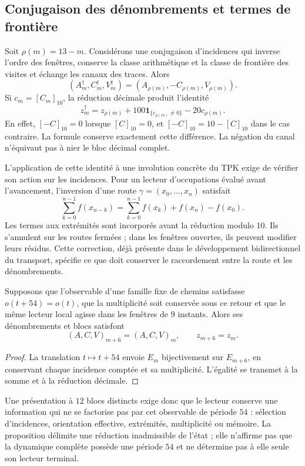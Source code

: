 \subsection{Conjugaison des dénombrements et termes de frontière}
\label{subsec:registro-conjugacion-incidencial}

Soit \(\rho(m)=13-m\). Considérons une conjugaison d'incidences
qui inverse l'ordre des fenêtres, conserve la classe arithmétique et la
classe de frontière des visites et échange les canaux des traces.
Alors
\[
 (A_m^\dagger,C_m^\dagger,V_m^\dagger)
 =(A_{\rho(m)},-C_{\rho(m)},V_{\rho(m)}).
\]
Si \(c_m=[C_m]_{10}\), la réduction décimale produit l'identité
\begin{equation}
 z_m^\dagger=z_{\rho(m)}
       +100\mathbf1_{\{c_{\rho(m)}\ne0\}}-20c_{\rho(m)}.
 \label{eq:registro-conjugacion-decimal}
\end{equation}
En effet, \([-C]_{10}=0\) lorsque \([C]_{10}=0\), et
\([-C]_{10}=10-[C]_{10}\) dans le cas contraire. La formule conserve
exactement cette différence. La négation du canal n'équivaut pas à nier
le bloc décimal complet.

L'application de cette identité à une involution concrète du TPK exige
de vérifier son action sur les incidences. Pour un lecteur d'occupations
évalué avant l'avancement, l'inversion d'une route
\(\gamma=(x_0,\ldots,x_n)\) satisfait
\[
 \sum_{k=0}^{n-1}f(x_{n-k})
 =\sum_{k=0}^{n-1}f(x_k)+f(x_n)-f(x_0).
\]
Les termes aux extrémités sont incorporés avant la réduction modulo
\(10\). Ils s'annulent sur les routes fermées ; dans les fenêtres ouvertes, ils peuvent
modifier leurs résidus. Cette correction, déjà présente dans le développement
bidirectionnel du transport, spécifie ce que doit conserver le raccordement
entre la route et les dénombrements.

\begin{proposition}
Supposons que l’observable d’une famille fixe de chemins satisfasse
\(o(t+54)=o(t)\), que la multiplicité soit conservée sous ce retour
et que le même lecteur local agisse dans les fenêtres de \(9\) instants.
Alors ses dénombrements et blocs satisfont
\[
 (A,C,V)_{m+6}=(A,C,V)_m,\qquad z_{m+6}=z_m.
\]
\end{proposition}

\begin{proof}
La translation \(t\mapsto t+54\) envoie \(E_m\) bijectivement
sur \(E_{m+6}\), en conservant chaque incidence comptée et sa multiplicité.
L'égalité se transmet à la somme et à la réduction décimale.
\end{proof}

Une présentation à \(12\) blocs distincts exige donc que
le lecteur conserve une information qui ne se factorise pas par cet observable
de période \(54\) : sélection d'incidences, orientation effective,
extrémités, multiplicité ou mémoire. La proposition délimite une réduction
inadmissible de l'état ; elle n'affirme pas que la dynamique complète possède une
période \(54\) et ne détermine pas à elle seule son lecteur terminal.
